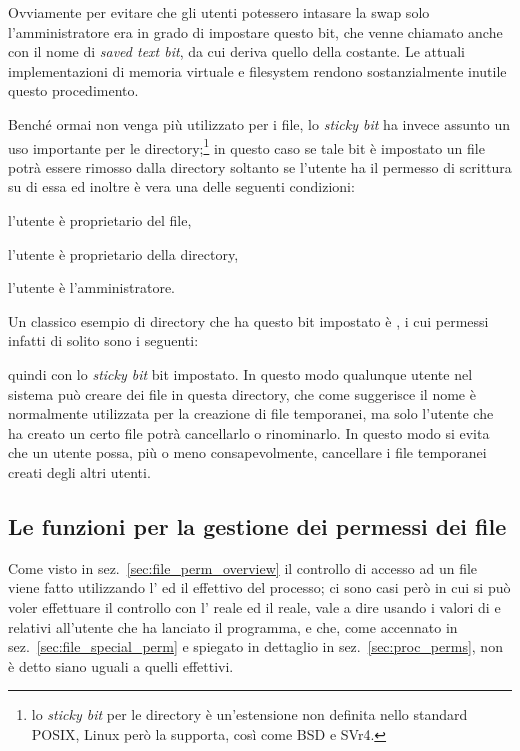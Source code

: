 Ovviamente per evitare che gli utenti potessero intasare la swap solo
l'amministratore era in grado di impostare questo bit, che venne chiamato
anche con il nome di \textit{saved text bit}, da cui deriva quello della
costante.  Le attuali implementazioni di memoria virtuale e filesystem rendono
sostanzialmente inutile questo procedimento.

Benché ormai non venga più utilizzato per i file, lo \textit{sticky bit} ha
invece assunto un uso importante per le directory;\footnote{lo \textit{sticky
    bit} per le directory è un'estensione non definita nello standard POSIX,
  Linux però la supporta, così come BSD e SVr4.} in questo caso se tale bit è
impostato un file potrà essere rimosso dalla directory soltanto se l'utente ha
il permesso di scrittura su di essa ed inoltre è vera una delle seguenti
condizioni:
\begin{itemize*}
\item l'utente è proprietario del file,
\item l'utente è proprietario della directory,
\item l'utente è l'amministratore.
\end{itemize*}

Un classico esempio di directory che ha questo bit impostato è , i
cui permessi infatti di solito sono i seguenti:
quindi con lo \textit{sticky bit} bit impostato. In questo modo qualunque
utente nel sistema può creare dei file in questa directory, che come
suggerisce il nome è normalmente utilizzata per la creazione di file
temporanei, ma solo l'utente che ha creato un certo file potrà cancellarlo o
rinominarlo. In questo modo si evita che un utente possa, più o meno
consapevolmente, cancellare i file temporanei creati degli altri utenti.




\subsection{Le funzioni per la gestione dei permessi dei file}
\label{sec:file_perm_management}

Come visto in sez.~\ref{sec:file_perm_overview} il controllo di accesso ad un
file viene fatto utilizzando l' ed il  effettivo del
processo; ci sono casi però in cui si può voler effettuare il controllo con
l' reale ed il  reale, vale a dire usando i valori di
 e  relativi all'utente che ha lanciato il programma, e che,
come accennato in sez.~\ref{sec:file_special_perm} e spiegato in dettaglio in
sez.~\ref{sec:proc_perms}, non è detto siano uguali a quelli effettivi.

